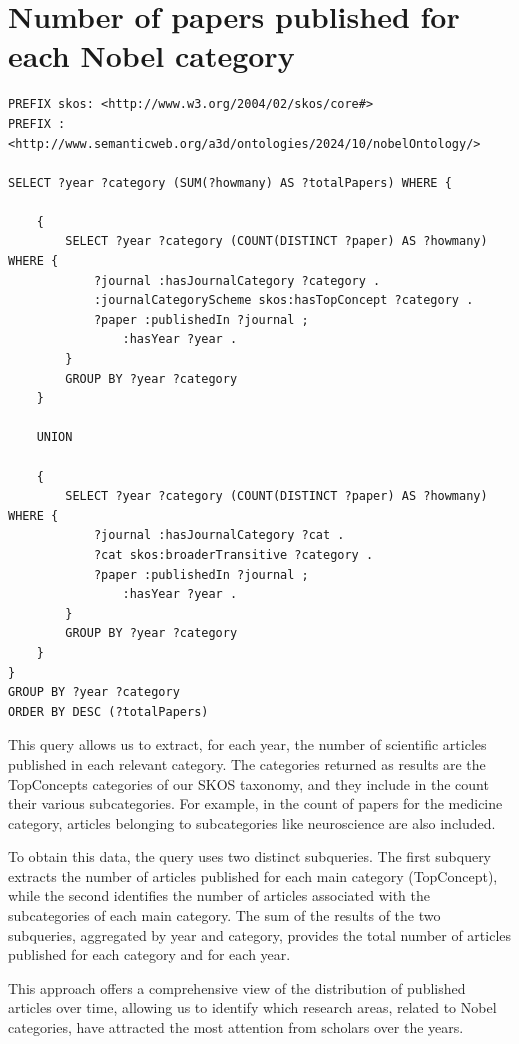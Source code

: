 \documentclass{article}
\begin{document}
\newpage

\section{Number of papers published for each Nobel category}
\begin{lstlisting}
PREFIX skos: <http://www.w3.org/2004/02/skos/core#>
PREFIX : <http://www.semanticweb.org/a3d/ontologies/2024/10/nobelOntology/>

SELECT ?year ?category (SUM(?howmany) AS ?totalPapers) WHERE {

    {
        SELECT ?year ?category (COUNT(DISTINCT ?paper) AS ?howmany) WHERE {
            ?journal :hasJournalCategory ?category .
            :journalCategoryScheme skos:hasTopConcept ?category .
            ?paper :publishedIn ?journal ;
                :hasYear ?year .
        }
        GROUP BY ?year ?category
    }

    UNION

    {
        SELECT ?year ?category (COUNT(DISTINCT ?paper) AS ?howmany) WHERE {
            ?journal :hasJournalCategory ?cat .
            ?cat skos:broaderTransitive ?category .
            ?paper :publishedIn ?journal ;
                :hasYear ?year .
        }
        GROUP BY ?year ?category
    }
}
GROUP BY ?year ?category
ORDER BY DESC (?totalPapers)
\end{lstlisting}

\noindent This query allows us to extract, for each year, the number of scientific articles published in each relevant category. The categories returned
as results are the TopConcepts categories of our SKOS taxonomy, and they include in the count their various subcategories. For example, in the count
of papers for the medicine category, articles belonging to subcategories like neuroscience are also included.

To obtain this data, the query uses two distinct subqueries. The first subquery extracts the number of articles published for each main category
(TopConcept), while the second identifies the number of articles associated with the subcategories of each main category. The sum of the results of
the two subqueries, aggregated by year and category, provides the total number of articles published for each category and for each year.

\newpage

\noindent This approach offers a comprehensive view of the distribution of published articles over time, allowing us to identify which research areas, related
to Nobel categories, have attracted the most attention from scholars over the years.
\end{document}
